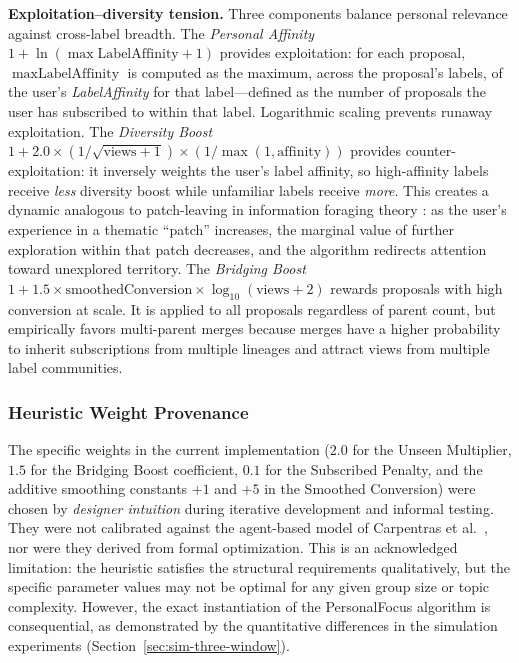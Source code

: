 \documentclass[a4paper, 12pt, twoside]{iviathesis}
\begin{document}
\textbf{Exploitation--diversity tension.} Three components balance personal relevance against cross-label breadth. The \textit{Personal Affinity} $1 + \ln(\max\text{LabelAffinity} + 1)$ provides exploitation: for each proposal, $\max\text{LabelAffinity}$ is computed as the maximum, across the proposal's labels, of the user's \textit{LabelAffinity} for that label---defined as the number of proposals the user has subscribed to within that label. Logarithmic scaling prevents runaway exploitation. The \textit{Diversity Boost} $1 + 2.0 \times (1/\sqrt{\text{views}+1}) \times (1/\max(1, \text{affinity}))$ provides counter-exploitation: it inversely weights the user's label affinity, so high-affinity labels receive \textit{less} diversity boost while unfamiliar labels receive \textit{more}. This creates a dynamic analogous to patch-leaving in information foraging theory \cite{pirolli1999}: as the user's experience in a thematic ``patch'' increases, the marginal value of further exploration within that patch decreases, and the algorithm redirects attention toward unexplored territory. The \textit{Bridging Boost} $1 + 1.5 \times \text{smoothedConversion} \times \log_{10}(\text{views}+2)$ rewards proposals with high conversion at scale. It is applied to all proposals regardless of parent count, but empirically favors multi-parent merges because merges have a higher probability to inherit subscriptions from multiple lineages and attract views from multiple label communities.


\subsubsection{Heuristic Weight Provenance}
\label{sec:heuristic-provenance}
The specific weights in the current implementation ($2.0$ for the Unseen Multiplier, $1.5$ for the Bridging Boost coefficient, $0.1$ for the Subscribed Penalty, and the additive smoothing constants $+1$ and $+5$ in the Smoothed Conversion) were chosen by \textit{designer intuition} during iterative development and informal testing. They were not calibrated against the agent-based model of Carpentras et al.\ \cite{carpentras_wisdom_2025}, nor were they derived from formal optimization. This is an acknowledged limitation: the heuristic satisfies the structural requirements qualitatively, but the specific parameter values may not be optimal for any given group size or topic complexity. However, the exact instantiation of the PersonalFocus algorithm is consequential, as demonstrated by the quantitative differences in the simulation experiments (Section~\ref{sec:sim-three-window}).
\end{document}
